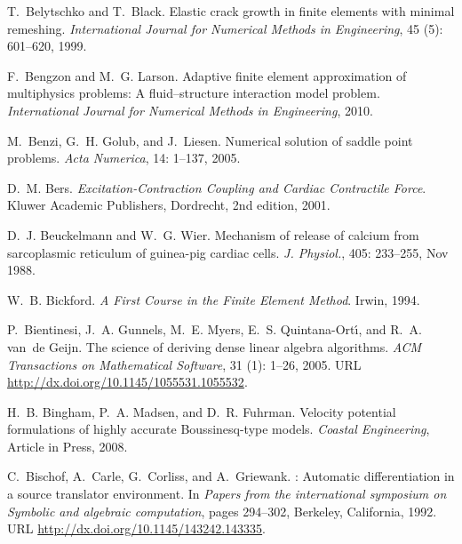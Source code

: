 \begin{thebibliography}{467}
T.~Belytschko and T.~Black.
\newblock Elastic crack growth in finite elements with minimal remeshing.
\newblock \emph{International Journal for Numerical Methods in Engineering},
  45 (5): 601--620, 1999.

F.~Bengzon and M.~G. Larson.
\newblock Adaptive finite element approximation of multiphysics problems: {A}
  fluid--structure interaction model problem.
\newblock \emph{International Journal for Numerical Methods in Engineering},
  2010.

M.~Benzi, G.~H. Golub, and J.~Liesen.
\newblock Numerical solution of saddle point problems.
\newblock \emph{Acta Numerica}, 14: 1--137, 2005.

D.~M. Bers.
\newblock \emph{Excitation-Contraction Coupling and Cardiac Contractile Force}.
\newblock Kluwer Academic Publishers, Dordrecht, 2nd edition, 2001.

D.~J. Beuckelmann and W.~G. Wier.
\newblock Mechanism of release of calcium from sarcoplasmic reticulum of
  guinea-pig cardiac cells.
\newblock \emph{J. Physiol.}, 405: 233--255, Nov 1988.

W.~B. Bickford.
\newblock \emph{A First Course in the Finite Element Method}.
\newblock Irwin, 1994.

P.~Bientinesi, J.~A. Gunnels, M.~E. Myers, E.~S. Quintana-Ort\'{\i}, and R.~A.
  van~de Geijn.
\newblock The science of deriving dense linear algebra algorithms.
\newblock \emph{ACM Transactions on Mathematical Software}, 31
  (1): 1--26, 2005.
\newblock URL \url{http://dx.doi.org/10.1145/1055531.1055532}.

H.~B. Bingham, P.~A. Madsen, and D.~R. Fuhrman.
\newblock Velocity potential formulations of highly accurate {B}oussinesq-type
  models.
\newblock \emph{Coastal Engineering}, Article in Press, 2008.

C.~Bischof, A.~Carle, G.~Corliss, and A.~Griewank.
: Automatic differentiation in a source translator
  environment.
\newblock In \emph{Papers from the international symposium on Symbolic and
  algebraic computation}, pages 294--302, Berkeley, California, 1992.
\newblock URL \url{http://dx.doi.org/10.1145/143242.143335}.


\end{thebibliography}
